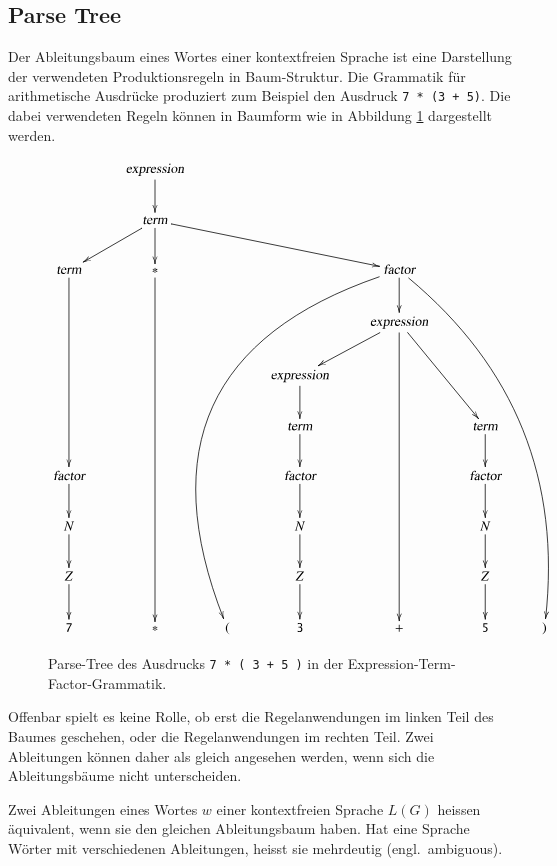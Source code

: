 \subsection{Parse Tree}
%
%
Der Ableitungsbaum eines Wortes einer kontextfreien Sprache
ist eine Darstellung der verwendeten Produktionsregeln in Baum-Struktur.
%
Die Grammatik für arithmetische Ausdrücke produziert zum Beispiel
den Ausdruck {\tt 7 * (3 + 5)}.
Die dabei verwendeten Regeln können in Baumform wie in
Abbildung \ref{etf-parse-tree} dargestellt werden.

\begin{figure}
{
\small
\[
\xymatrix{
	&\textsl{expression} \ar[d]
\\
	&\textsl{term} \ar[dl] \ar[d] \ar[drrr]
\\
\textsl{term}\ar[dddd]
	&{\tt *}\ar[ddddddd]
		&
			&
				&\textsl{factor}\ar@/_80pt/[dddddddll]\ar[d]\ar@/^40pt/[dddddddrr]
					&
						&
\\
	&
		&
			&
				&\textsl{expression}\ar[dl]\ar[dddddd]\ar[ddr]
					&
\\
	&
		&
			&\textsl{expression}\ar[d]
				&
					&
						&
\\
	&
		&
			&\textsl{term}\ar[d]
				&
					&\textsl{term}\ar[d]
						&
\\
\textsl{factor}\ar[d]
	&
		&
			&\textsl{factor}\ar[d]
				&
					&\textsl{factor}\ar[d]
						&
\\
N\ar[d]
	&
		&
			&N\ar[d]
				&
					&N\ar[d]
						&
\\
Z\ar[d]
	&
		&
			&Z\ar[d]
				&
					&Z\ar[d]
						&
\\
{\tt 7}
	&{\tt *}
		&{\tt (}
			&{\tt 3}
				&{\tt +}
					&{\tt 5}
						&{\tt )}
}
\]
}
\caption{Parse-Tree des Ausdrucks \texttt{7 * ( 3 + 5 )} in der
Expression-Term-Factor-Grammatik.
\label{etf-parse-tree}}
\end{figure}

Offenbar spielt es keine Rolle, ob erst die Regelanwendungen
im linken Teil des Baumes geschehen, oder die Regelanwendungen im
rechten Teil. Zwei Ableitungen können daher als gleich angesehen
werden, wenn sich die Ableitungsbäume nicht unterscheiden.

\begin{definition}
%
Zwei Ableitungen eines Wortes $w$ einer kontextfreien Sprache $L(G)$
heissen äquivalent, wenn sie den gleichen Ableitungsbaum haben.
Hat eine Sprache Wörter mit verschiedenen Ableitungen, heisst
sie mehrdeutig (engl.~ambiguous).
\end{definition}

